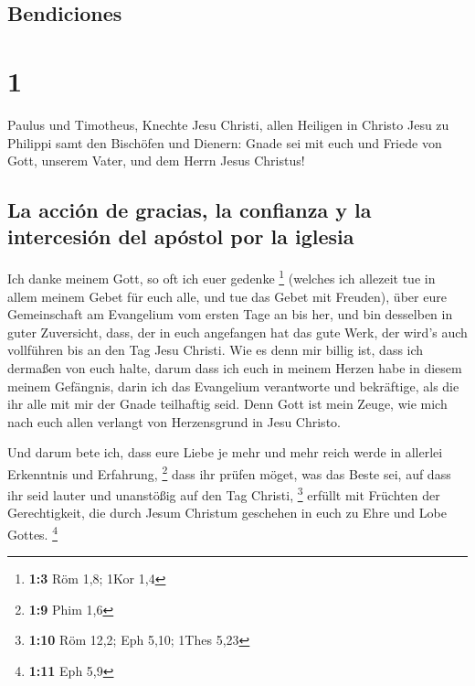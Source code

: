 \hypertarget{bendiciones}{%
\subsection{Bendiciones}\label{bendiciones}}

\hypertarget{section}{%
\section{1}\label{section}}

 Paulus und Timotheus, Knechte Jesu Christi, allen
Heiligen in Christo Jesu zu Philippi samt den Bischöfen und Dienern:
 Gnade sei mit euch und Friede von Gott, unserem Vater,
und dem Herrn Jesus Christus!

\hypertarget{la-acciuxf3n-de-gracias-la-confianza-y-la-intercesiuxf3n-del-apuxf3stol-por-la-iglesia}{%
\subsection{La acción de gracias, la confianza y la intercesión del
apóstol por la
iglesia}\label{la-acciuxf3n-de-gracias-la-confianza-y-la-intercesiuxf3n-del-apuxf3stol-por-la-iglesia}}

 Ich danke meinem Gott, so oft ich euer gedenke
\footnote{\textbf{1:3} Röm 1,8; 1Kor 1,4}  (welches ich
allezeit tue in allem meinem Gebet für euch alle, und tue das Gebet mit
Freuden),  über eure Gemeinschaft am Evangelium vom ersten
Tage an bis her,  und bin desselben in guter Zuversicht,
dass, der in euch angefangen hat das gute Werk, der wird's auch
vollführen bis an den Tag Jesu Christi.  Wie es denn mir
billig ist, dass ich dermaßen von euch halte, darum dass ich euch in
meinem Herzen habe in diesem meinem Gefängnis, darin ich das Evangelium
verantworte und bekräftige, als die ihr alle mit mir der Gnade
teilhaftig seid.  Denn Gott ist mein Zeuge, wie mich nach
euch allen verlangt von Herzensgrund in Jesu Christo.

 Und darum bete ich, dass eure Liebe je mehr und mehr
reich werde in allerlei Erkenntnis und Erfahrung, \footnote{\textbf{1:9}
  Phim 1,6}  dass ihr prüfen möget, was das Beste sei,
auf dass ihr seid lauter und unanstößig auf den Tag Christi, \footnote{\textbf{1:10}
  Röm 12,2; Eph 5,10; 1Thes 5,23}  erfüllt mit Früchten
der Gerechtigkeit, die durch Jesum Christum geschehen in euch zu Ehre
und Lobe Gottes. \footnote{\textbf{1:11} Eph 5,9}


